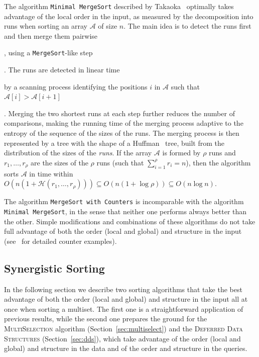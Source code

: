 The algorithm \texttt{Minimal MergeSort} described by
Takaoka~\cite{2009-Chapter-PartialSolutionAndEntropy-Takaoka}
optimally takes advantage of the local order in the input, as measured
by the decomposition into runs when sorting an array $\mathcal{A}$ of
size $n$.  The main idea is to detect the runs first and then merge
them pairwise\begin{LONG}, using a \texttt{MergeSort}-like
  step\end{LONG}. The runs are detected in linear time\begin{LONG} by
  a scanning process identifying the positions $i$ in $\mathcal{A}$
  such that $\mathcal{A}[i] > \mathcal{A}[i+1]$\end{LONG}. Merging the
two shortest runs at each step further reduces the number of
comparisons, making the running time of the merging process adaptive
to the entropy of the sequence of the sizes of the runs.  The merging
process is then represented by a tree with the shape of a
Huffman~\cite{1952-IRE-AMethodForTheInstructionOfMinimumRedundancyCodes-Huffman}
tree, built from the distribution of the sizes of the \emph{runs}.  If
the array $\mathcal{A}$ is formed by $\rho$ runs and
$r_1, \dots, r_{\rho}$ are the sizes of the $\rho$ runs (such that
$\sum_{i=1}^\rho {r_i}=n$), then the algorithm sorts $\mathcal{A}$ in
time within
$O(n(1+\mathcal{H}(r_1, \dots, r_{\rho}))) \subseteq
O(n(1{+}\log{\rho})) \subseteq O(n\log{n})$.

The algorithm \texttt{MergeSort with Counters} is incomparable with
the algorithm \texttt{Minimal MergeSort}, in the sense that neither
one performs always better than the other. Simple modifications and
combinations of these algorithms do not take full advantage of both
the order (local and global) and structure in the input
(see~\cite{2016-ARXIV-SynergisticSortingAndDeferredDataStructuresOnMultiSets-BarbayOchoaSatty}
for detailed counter examples).

\subsection{Synergistic Sorting}
\label{sec:syn-sort}

In the following section we describe two sorting algorithms that take
the best advantage of both the order (local and global) and structure
in the input all at once when sorting a multiset. The first one is a
straightforward application of previous results, while the second one
prepares the ground for the \textsc{MultiSelection} algorithm
(Section~\ref{sec:multiselect}) and the \textsc{Deferred Data
  Structures} (Section~\ref{sec:dds}), which take
advantage of the order (local and global) and structure in the data
and of the order and structure in the queries.

